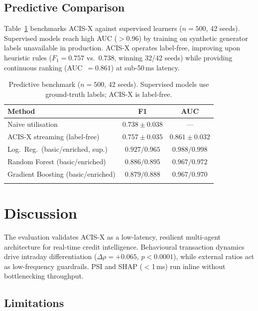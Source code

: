 \documentclass[pdflatex,sn-mathphys-num]{sn-jnl}
\theoremstyle{thmstyleone}
\theoremstyle{thmstyletwo}
\theoremstyle{thmstylethree}
\begin{document}
\subsection{Predictive Comparison}\label{subsec:predictive}

Table~\ref{tab:ml} benchmarks ACIS-X against supervised learners ($n{=}500$, 42 seeds). Supervised models reach high AUC ($>$0.96) by training on synthetic generator labels unavailable in production. ACIS-X operates label-free, improving upon heuristic rules ($F_1{=}0.757$ vs.\ $0.738$, winning 32/42 seeds) while providing continuous ranking (AUC~$=0.861$) at sub-50\,ms latency.

\begin{table}[htbp]
\caption{Predictive benchmark ($n{=}500$, 42 seeds). Supervised models use ground-truth labels; ACIS-X is label-free.}\label{tab:ml}
\centering\footnotesize
\begin{tabular}{@{}lcc@{}}
\toprule
\textbf{Method} & \textbf{F1} & \textbf{AUC} \\
\midrule
Naive utilisation             & $0.738 \pm 0.038$ & --- \\
ACIS-X streaming (label-free) & $0.757 \pm 0.035$ & $0.861 \pm 0.032$ \\
Log.\ Reg.\ (basic/enriched, sup.) & $0.927/0.965$  & $0.988/0.998$ \\
Random Forest (basic/enriched)      & $0.886/0.895$  & $0.967/0.972$ \\
Gradient Boosting (basic/enriched)  & $0.879/0.888$  & $0.967/0.970$ \\
\botrule
\end{tabular}
\end{table}

\section{Discussion}\label{sec:discussion}

The evaluation validates ACIS-X as a low-latency, resilient multi-agent architecture for real-time credit intelligence. Behavioural transaction dynamics drive intraday differentiation ($\Delta\rho{=}+0.065$, $p{<}0.0001$), while external ratios act as low-frequency guardrails. PSI and SHAP ($<$1\,ms) run inline without bottlenecking throughput.

\subsection{Limitations}\label{subsec:limitations}
\end{document}
